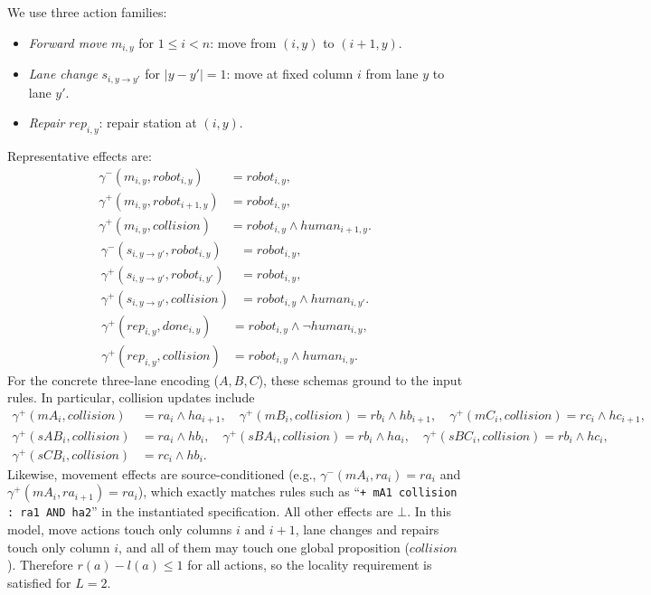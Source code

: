 \documentclass[]{jair}
\begin{document}
We use three action families:
\begin{itemize}
    \item {\it Forward move} $m_{i,y}$ for $1\le i<n$: move from $(i,y)$ to $(i+1,y)$.
    \item {\it Lane change} $s_{i,y\to y'}$ for $|y-y'|=1$: move at fixed column $i$ from lane $y$ to lane $y'$.
    \item {\it Repair} $rep_{i,y}$: repair station at $(i,y)$.
\end{itemize}
Representative effects are:
\begin{equation}
\begin{aligned}
\gamma^-(m_{i,y},robot_{i,y})&=robot_{i,y},\\
\gamma^+(m_{i,y},robot_{i+1,y})&=robot_{i,y},\\
\gamma^+(m_{i,y},collision)&=robot_{i,y}\land human_{i+1,y}.
\end{aligned}
\end{equation}
\begin{equation}
\begin{aligned}
\gamma^-(s_{i,y\to y'},robot_{i,y})&=robot_{i,y},\\
\gamma^+(s_{i,y\to y'},robot_{i,y'})&=robot_{i,y},\\
\gamma^+(s_{i,y\to y'},collision)&=robot_{i,y}\land human_{i,y'}.
\end{aligned}
\end{equation}
\begin{equation}
\begin{aligned}
\gamma^+(rep_{i,y},done_{i,y})&=robot_{i,y}\land \neg human_{i,y},\\
\gamma^+(rep_{i,y},collision)&=robot_{i,y}\land human_{i,y}.
\end{aligned}
\end{equation}
For the concrete three-lane encoding ($A,B,C$), these schemas ground to the input rules. In particular, collision updates include
\begin{equation}
\begin{aligned}
\gamma^+(mA_i,collision)&=ra_i\land ha_{i+1},\quad
\gamma^+(mB_i,collision)=rb_i\land hb_{i+1},\quad
\gamma^+(mC_i,collision)=rc_i\land hc_{i+1},\\
\gamma^+(sAB_i,collision)&=ra_i\land hb_i,\quad
\gamma^+(sBA_i,collision)=rb_i\land ha_i,\quad
\gamma^+(sBC_i,collision)=rb_i\land hc_i,\\
\gamma^+(sCB_i,collision)&=rc_i\land hb_i.
\end{aligned}
\end{equation}
Likewise, movement effects are source-conditioned (e.g., $\gamma^-(mA_i,ra_i)=ra_i$ and $\gamma^+(mA_i,ra_{i+1})=ra_i$), which exactly matches rules such as ``\texttt{+ mA1 collision : ra1 AND ha2}'' in the instantiated specification.
All other effects are $\bot$. In this model, move actions touch only columns $i$ and $i+1$, lane changes and repairs touch only column $i$, and all of them may touch one global proposition ($collision$). Therefore $r(a)-l(a)\le 1$ for all actions, so the locality requirement is satisfied for $L=2$.
\end{document}
